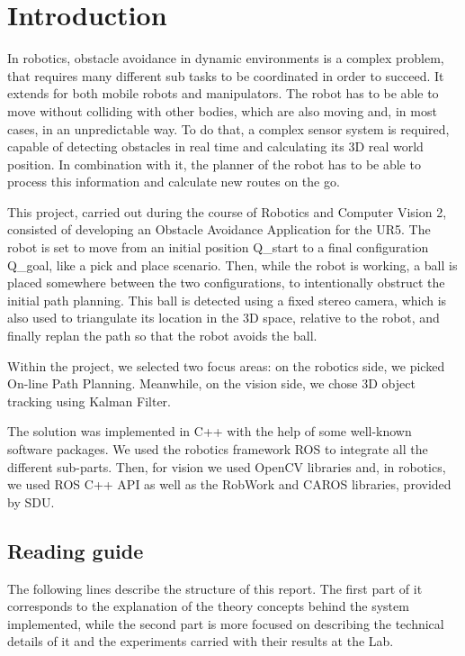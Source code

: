 \section{Introduction}
\label{sec:Introduction}

In robotics, obstacle avoidance in dynamic environments is a complex problem, that requires many different sub tasks to be coordinated in order to succeed. It extends for both mobile robots and manipulators. The robot has to be able to move without colliding with other bodies, which are also moving and, in most cases, in an unpredictable way. To do that, a complex sensor system is required, capable of detecting obstacles in real time and calculating its 3D real world position. In combination with it, the planner of the robot has to be able to process this information and calculate new routes on the go.

This project, carried out during the course of Robotics and Computer Vision 2, consisted of developing an Obstacle Avoidance Application for the UR5. The robot is set to move from an initial position Q\_start to a final configuration Q\_goal, like a pick and place scenario. Then, while the robot is working, a ball is placed somewhere between the two configurations, to intentionally obstruct the initial path planning. This ball is detected using a fixed stereo camera, which is also used to triangulate its location in the 3D space, relative to the robot, and finally replan the path so that the robot avoids the ball.

Within the project, we selected two focus areas: on the robotics side, we picked On-line Path Planning. Meanwhile, on the vision side, we chose 3D object tracking using Kalman Filter.

The solution was implemented in C++ with the help of some well-known software packages. We used the robotics framework ROS to integrate all the different sub-parts. Then, for vision we used OpenCV libraries and, in robotics, we used ROS C++ API as well as the RobWork and CAROS libraries, provided by SDU. 
\newpage
\subsection{Reading guide}

The following lines describe the structure of this report. The first part of it corresponds to the explanation of the theory concepts behind the system implemented, while the second part is more focused on describing the technical details of it and the experiments carried with their results at the Lab. 

